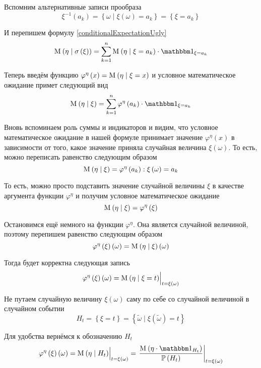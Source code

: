 Вспомним альтернативные записи прообраза
$$\xi^{-1}\left( a_k \right)
    = \left\{ \omega \mid \xi\left( \omega \right) = a_k \right\}
    = \left\{ \xi = a_k \right\}$$

И перепишем формулу \eqref{conditionalExpectationUgly}
$$\mean{\left( \eta \mid \sigma\left( \xi \right) \right)}
    = \sum_{k=1}^n \mean{\left( \eta \mid \xi = a_k \right)
        \cdot \indicatorof{\xi = a_k}}$$

Теперь введём функцию
$\varphi^{\eta}\left( x \right) = \mathrm{M}_{} \left( \eta \mid \xi=x \right)$
и условное математическое ожидание примет следующий вид
$$\mean{\left( \eta \mid \xi \right)}
    = \sum_{k=1}^n \varphi^{\eta}\left( a_k \right)
        \cdot \indicatorof{\xi = a_k}$$

Вновь вспоминаем роль суммы и индикаторов и видим,
что условное математическое ожидание в нашей формуле
принимает значение $\varphi^{\eta}\left( x \right)$ в зависимости от того,
какое значение приняла случайная величина $\xi\left( \omega \right)$.
То есть, можно переписать равенство следующим образом
$$\mathrm{M}_{} \left( \eta \mid \xi \right)
    = \varphi^{\eta}\left( a_k \right): \xi\left( \omega \right) = a_k$$

То есть, можно просто подставить значение случайной величины $\xi$
в качестве аргумента функции $\varphi^{\eta}$
и получим условное математическое ожидание
$$\mathrm{M}_{} \left( \eta \mid \xi \right)
    = \varphi^{\eta}\left( \xi \right)$$

Остановимся ещё немного на функции $\varphi^{\eta}$.
Она является случайной величиной, поэтому перепишем равенство следующим образом
$$\varphi^{\eta}\left( \xi \right)\left( \omega \right)
    = \mathrm{M}_{} \left( \eta \mid \xi \right)\left( \omega \right)$$

Тогда будет корректна следующая запись
$$\varphi^{\eta}\left( \xi \right)\left( \omega \right)
    = \Bigl. \mathrm{M}_{} \left( \eta \mid \xi = t \right)
        \Bigr|_{t=\xi\left( \omega \right)}$$

Не путаем случайную величину $\xi\left( \omega \right)$ саму по себе
со случайной величиной в случайном событии
$$H_t = \left\{ \xi = t \right\}
    = \left\{ \tilde{\omega}\mid \xi\left( \tilde{\omega} \right) = t \right\}$$

Для удобства вернёмся к обозначению $H_t$
$$\varphi^{\eta}\left( \xi \right)\left( \omega \right)
    = \Bigl. \mean{\left( \eta \mid H_t \right)}
        \Bigr|_{t=\xi\left( \omega \right)}
    = \left. \frac{\mean{\left( \eta \cdot \indicatorof{H_t} \right)}}
        {\probability{H_t}} \right|_{t=\xi\left( \omega \right)}$$

